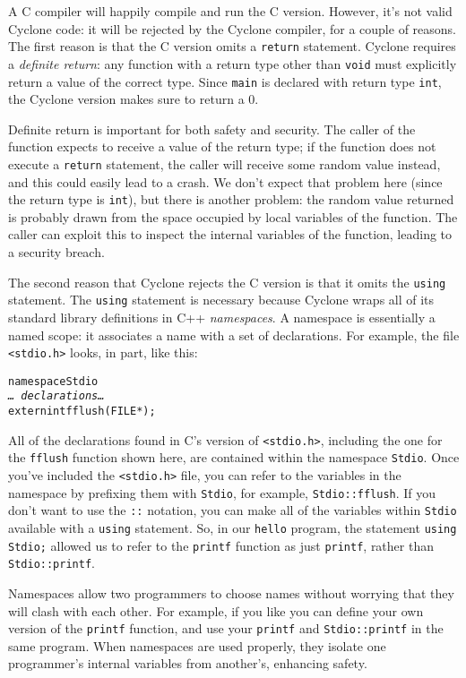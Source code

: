 A C compiler will happily compile and run the C version.  However,
it's not valid Cyclone code: it will be rejected by the Cyclone
compiler, for a couple of reasons.  The first reason is that the C
version omits a \texttt{return} statement.  Cyclone requires a
\emph{definite return}: any function with a return type other than
\texttt{void} must explicitly return a value of the correct type.
Since \texttt{main} is declared with return type \texttt{int}, the
Cyclone version makes sure to return a 0.

Definite return is important for both safety and security.  The caller
of the function expects to receive a value of the return type; if the
function does not execute a \texttt{return} statement, the caller will
receive some random value instead, and this could easily lead to a
crash.  We don't expect that problem here (since the return type is
\texttt{int}), but there is another problem: the random value returned
is probably drawn from the space occupied by local variables of the
function.  The caller can exploit this to inspect the internal
variables of the function, leading to a security breach.

The second reason that Cyclone rejects the C version is that it omits
the \texttt{using} statement.  The \texttt{using} statement is
necessary because Cyclone wraps all of its standard library
definitions in C++ \emph{namespaces}.  A namespace is essentially a
named scope: it associates a name with a set of declarations.  For
example, the file \texttt{<stdio.h>} looks, in part, like this:
\begin{alltt}
    namespace Stdio \lb
      {\it \ldots\ declarations \ldots}
      extern int fflush(FILE *);
    \rb
\end{alltt}
All of the declarations found in C's version of \texttt{<stdio.h>},
including the one for the \texttt{fflush} function shown here, are
contained within the namespace \texttt{Stdio}.  Once you've included
the \texttt{<stdio.h>} file, you can refer to the variables in the
namespace by prefixing them with \texttt{Stdio}, for example,
\texttt{Stdio::fflush}.  If you don't want to use the \texttt{::}
notation, you can make all of the variables within \texttt{Stdio}
available with a \texttt{using} statement.  So, in our \texttt{hello}
program, the statement \texttt{using Stdio;} allowed us to refer to
the \texttt{printf} function as just \texttt{printf}, rather than
\texttt{Stdio::printf}.

Namespaces allow two programmers to choose names without worrying that
they will clash with each other.  For example, if you like you can
define your own version of the \texttt{printf} function, and use your
\texttt{printf} and \texttt{Stdio::printf} in the same program.  When
namespaces are used properly, they isolate one programmer's internal
variables from another's, enhancing safety.

